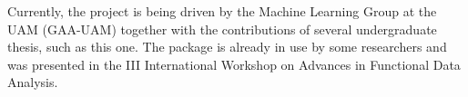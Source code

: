 Currently, the project is being driven by the Machine
Learning Group at the UAM (GAA-UAM) together with the contributions of several
undergraduate thesis, such as this one.
The package is already in use by some researchers and was presented
in the III International Workshop on Advances in Functional Data
Analysis\cite{workshop}.
